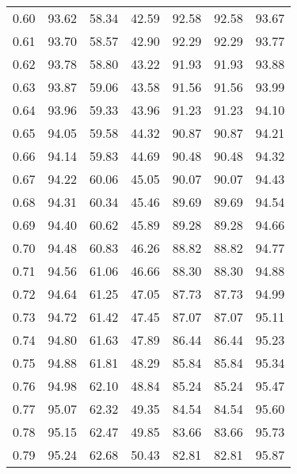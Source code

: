 \begin{tabular}{|c|c|c|c|c|c|c|}
      0.60 &     93.62 &     58.34 &      42.59 &   92.58 &      92.58 &         93.67 \\
      0.61 &     93.70 &     58.57 &      42.90 &   92.29 &      92.29 &         93.77 \\
      0.62 &     93.78 &     58.80 &      43.22 &   91.93 &      91.93 &         93.88 \\
      0.63 &     93.87 &     59.06 &      43.58 &   91.56 &      91.56 &         93.99 \\
      0.64 &     93.96 &     59.33 &      43.96 &   91.23 &      91.23 &         94.10 \\
      0.65 &     94.05 &     59.58 &      44.32 &   90.87 &      90.87 &         94.21 \\
      0.66 &     94.14 &     59.83 &      44.69 &   90.48 &      90.48 &         94.32 \\
      0.67 &     94.22 &     60.06 &      45.05 &   90.07 &      90.07 &         94.43 \\
      0.68 &     94.31 &     60.34 &      45.46 &   89.69 &      89.69 &         94.54 \\
      0.69 &     94.40 &     60.62 &      45.89 &   89.28 &      89.28 &         94.66 \\
      0.70 &     94.48 &     60.83 &      46.26 &   88.82 &      88.82 &         94.77 \\
      0.71 &     94.56 &     61.06 &      46.66 &   88.30 &      88.30 &         94.88 \\
      0.72 &     94.64 &     61.25 &      47.05 &   87.73 &      87.73 &         94.99 \\
      0.73 &     94.72 &     61.42 &      47.45 &   87.07 &      87.07 &         95.11 \\
      0.74 &     94.80 &     61.63 &      47.89 &   86.44 &      86.44 &         95.23 \\
      0.75 &     94.88 &     61.81 &      48.29 &   85.84 &      85.84 &         95.34 \\
      0.76 &     94.98 &     62.10 &      48.84 &   85.24 &      85.24 &         95.47 \\
      0.77 &     95.07 &     62.32 &      49.35 &   84.54 &      84.54 &         95.60 \\
      0.78 &     95.15 &     62.47 &      49.85 &   83.66 &      83.66 &         95.73 \\
      0.79 &     95.24 &     62.68 &      50.43 &   82.81 &      82.81 &         95.87 \\

\end{tabular}
